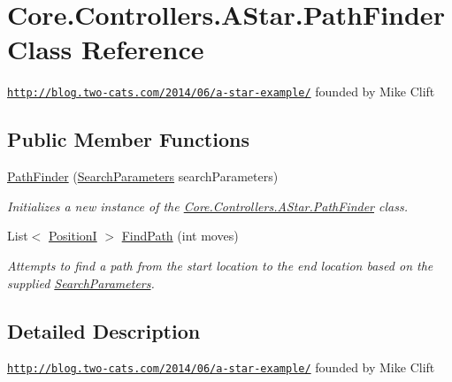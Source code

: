 \hypertarget{classCore_1_1Controllers_1_1AStar_1_1PathFinder}{}\section{Core.\+Controllers.\+A\+Star.\+Path\+Finder Class Reference}
\label{classCore_1_1Controllers_1_1AStar_1_1PathFinder}


\href{http://blog.two-cats.com/2014/06/a-star-example/}{\tt http\+://blog.\+two-\/cats.\+com/2014/06/a-\/star-\/example/} founded by Mike Clift  


\subsection*{Public Member Functions}
\begin{DoxyCompactItemize}
\item 
\hyperlink{classCore_1_1Controllers_1_1AStar_1_1PathFinder_a010f9bbebe661b7f1bdbc57355672774}{Path\+Finder} (\hyperlink{classCore_1_1Controllers_1_1AStar_1_1SearchParameters}{Search\+Parameters} search\+Parameters)
\begin{DoxyCompactList}\small\item\em Initializes a new instance of the \hyperlink{classCore_1_1Controllers_1_1AStar_1_1PathFinder}{Core.\+Controllers.\+A\+Star.\+Path\+Finder} class. \end{DoxyCompactList}\item 
List$<$ \hyperlink{classCore_1_1Models_1_1PositionI}{Position\+I} $>$ \hyperlink{classCore_1_1Controllers_1_1AStar_1_1PathFinder_ae1ba82b76a9c6049fd47ed6b512a0d80}{Find\+Path} (int moves)
\begin{DoxyCompactList}\small\item\em Attempts to find a path from the start location to the end location based on the supplied \hyperlink{classCore_1_1Controllers_1_1AStar_1_1SearchParameters}{Search\+Parameters}. \end{DoxyCompactList}\end{DoxyCompactItemize}


\subsection{Detailed Description}
\href{http://blog.two-cats.com/2014/06/a-star-example/}{\tt http\+://blog.\+two-\/cats.\+com/2014/06/a-\/star-\/example/} founded by Mike Clift 




